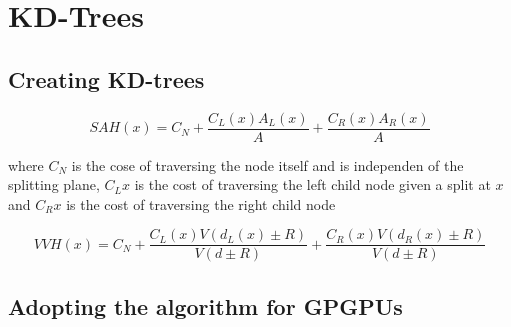 \chapter{KD-Trees}


\section{Creating KD-trees}


\begin{displaymath}
  SAH(x) = C_N + \frac{C_L(x) A_L(x)}{A} + \frac{C_R(x) A_R(x)}{A}
\end{displaymath}

where $C_N$ is the cose of traversing the node itself and is
independen of the splitting plane, $C_L{x}$ is the cost of traversing
the left child node given a split at $x$ and $C_R{x}$ is the cost of
traversing the right child node

\begin{displaymath}
  VVH(x) = C_N + \frac{C_L(x) V(d_L(x) \pm R)}{V(d \pm R)} +
  \frac{C_R(x) V(d_R(x) \pm R)}{V(d \pm R)}
\end{displaymath}

\section{Adopting the algorithm for GPGPUs}







